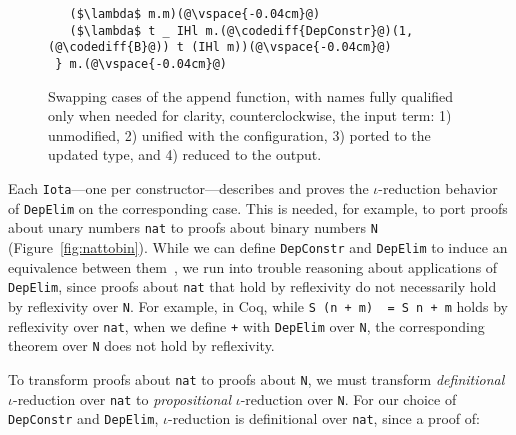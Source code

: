 \begin{figure*}
\begin{minipage}{0.49\textwidth}
\begin{lstlisting}
   ($\lambda$ m.m)(@\vspace{-0.04cm}@)
   ($\lambda$ t _ IHl m.(@\codediff{DepConstr}@)(1, (@\codediff{B}@)) t (IHl m))(@\vspace{-0.04cm}@)
 } m.(@\vspace{-0.04cm}@)
\end{lstlisting}
\end{minipage}
\vspace{-0.4cm}
\caption{Swapping cases of the append function, with names fully qualified only when needed for clarity, counterclockwise, the input term: 1) unmodified, 2) unified with the configuration, 3) ported to the updated type, and 4) reduced to the output.}
\label{fig:appswap1}
\end{figure*}

Each \lstinline{Iota}---one per constructor---describes and proves the $\iota$-reduction behavior
of \lstinline{DepElim} on the corresponding case.
This is needed, for example, to port proofs about unary numbers \lstinline{nat} to
proofs about binary numbers \lstinline{N} (Figure~\ref{fig:nattobin}).
While we can define \lstinline{DepConstr} and \lstinline{DepElim} to induce an equivalence
between them~, %
we run into trouble reasoning about applications of \lstinline{DepElim},
since proofs about \lstinline{nat} that hold by reflexivity do not necessarily hold by reflexivity over \lstinline{N}. 
For example, in Coq, while \lstinline{S (n + m)  = S n + m} holds by reflexivity over \lstinline{nat},
when we define \lstinline{+} with \lstinline{DepElim} over \lstinline{N},
the corresponding theorem over \lstinline{N} does not hold by reflexivity.

To transform proofs about \lstinline{nat} to proofs about \lstinline{N}, we must transform \textit{definitional} $\iota$-reduction over \lstinline{nat} to \textit{propositional} $\iota$-reduction over \lstinline{N}.
For our choice of \lstinline{DepConstr} and \lstinline{DepElim},
$\iota$-reduction is definitional over \lstinline{nat}, since a proof of:\vspace{-0.01cm}

